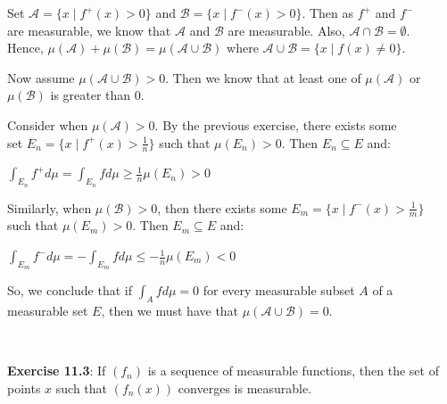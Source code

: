 \documentclass{book}
\newcommand{\exTwo}{%
   \color{RedViolet}%
   \fontsize{13}{15}\selectfont%
}
\newenvironment{myIndent}{%
   \begin{adjustwidth}{2.5em}{0em}%
}{%
   \end{adjustwidth}%
}
\newcommand{\mySepTwo}[1][.]{%
   {\noindent\color{#1}{\rule{6.5in}{0.5mm}}}\\%
}
\newcommand{\retTwo}{\hfill\bigbreak}
\begin{document}
{\begin{myIndent}\exTwo
   Set $\mathcal{A} = \{x \mid f^+(x) > 0\}$ and $\mathcal{B} = \{x \mid f^-(x) > 0\}$. Then as $f^+$ and $f^-$\\ are measurable, we know that $\mathcal{A}$ and $\mathcal{B}$ are measurable. Also, $\mathcal{A} \cap \mathcal{B} = \emptyset$.\\ Hence, $\mu(\mathcal{A}) + \mu(\mathcal{B}) = \mu(\mathcal{A} \cup \mathcal{B})$ where $\mathcal{A} \cup \mathcal{B} = \{x \mid f(x) \neq 0\}$.\retTwo

   Now assume $\mu(\mathcal{A} \cup \mathcal{B}) > 0$. Then we know that at least one of $\mu(\mathcal{A})$ or\\ $\mu(\mathcal{B})$ is greater than $0$.\retTwo
   
   Consider when $\mu(\mathcal{A}) > 0$. By the previous exercise, there exists some\\ set $E_n = \{x \mid f^+(x) > \frac{1}{n}\}$ such that $\mu(E_n) > 0$. Then $E_n \subseteq E$ and:

   {\centering $\int_{E_n} f^+d\mu = \int_{E_n} fd\mu \geq \frac{1}{n}\mu(E_n) > 0$\retTwo\par}

   Similarly, when $\mu(\mathcal{B}) > 0$, then there exists some $E_m = \{x \mid f^-(x) > \frac{1}{m}\}$\\ such that $\mu(E_m) > 0$. Then $E_m \subseteq E$ and:

   {\centering $\int_{E_m} f^-d\mu = -\int_{E_m} fd\mu \leq -\frac{1}{n}\mu(E_m) < 0$\retTwo\par}

   So, we conclude that if $\int_A fd\mu = 0$ for every measurable subset $A$ of a\\ measurable set $E$, then we must have that $\mu(\mathcal{A} \cup \mathcal{B}) = 0$.\retTwo
\end{myIndent}}

\mySepTwo

\newpage

\textbf{Exercise 11.3}: If $(f_n)$ is a sequence of measurable functions, then the set of\\ points $x$ such that $(f_n(x))$ converges is measurable.\\ [-6pt]
\end{document}
